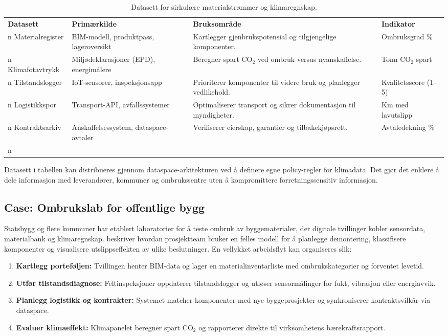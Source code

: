 \begin{table}[ht]
    \centering
    \caption{Datasett for sirkulære materialstrømmer og klimaregnskap.}
    \label{tab:kap03-sirkular-data}
    \begin{tabular}{p{}p{}p{}p{}}
        \toprule
        \textbf{Datasett} & \textbf{Primærkilde} & \textbf{Bruksområde} & \textbf{Indikator} \\n        \midrule
        Materialregister & BIM-modell, produktpass, lageroversikt & Kartlegger gjenbrukspotensial og tilgjengelige komponenter. & Ombruksgrad \% \\n        Klimafotavtrykk & Miljødeklarasjoner (EPD), energimålere & Beregner spart CO$_2$ ved ombruk versus nyanskaffelse. & Tonn CO$_2$ spart \\n        Tilstandslogger & IoT-sensorer, inspeksjonsapp & Prioriterer komponenter til videre bruk og planlegger vedlikehold. & Kvalitetsscore (1--5) \\n        Logistikkspor & Transport-API, avfallssystemer & Optimaliserer transport og sikrer dokumentasjon til myndigheter. & Km med lavutslipp \\n        Kontraktsarkiv & Anskaffelsessystem, dataspace-avtaler & Verifiserer eierskap, garantier og tilbakekjøpsrett. & Avtaledekning \% \\n        \bottomrule
    \end{tabular}
\end{table}

Datasett i tabellen kan distribueres gjennom dataspace-arkitekturen ved å definere egne policy-regler for klimadata. Det gjør det enklere å
dele informasjon med leverandører, kommuner og ombrukssentre uten å kompromittere forretningssensitiv informasjon.

\subsection{Case: Ombrukslab for offentlige bygg}
Statsbygg og flere kommuner har etablert laboratorier for å teste ombruk av byggematerialer, der digitale tvillinger kobler sensordata,
materialbank og klimaregnskap. \citet{statsbygg2022ombruk} beskriver hvordan prosjektteam bruker en felles modell for å planlegge demontering,
klassifisere komponenter og visualisere utslippseffekten av ulike beslutninger. En vellykket arbeidsflyt kan organiseres slik:
\begin{enumerate}
    \item \textbf{Kartlegg porteføljen:} Tvillingen henter BIM-data og lager en materialinventarliste med ombrukskategorier og forventet levetid.
    \item \textbf{Utfør tilstandsdiagnose:} Feltinspeksjoner oppdaterer tilstandslogger og utløser sensormålinger for fukt, vibrasjon eller energiavvik.
    \item \textbf{Planlegg logistikk og kontrakter:} Systemet matcher komponenter med nye byggeprosjekter og synkroniserer kontraktsvilkår via dataspace.
    \item \textbf{Evaluer klimaeffekt:} Klimapanelet beregner spart CO$_2$ og rapporterer direkte til virksomhetens bærekraftsrapport.
\end{enumerate}

